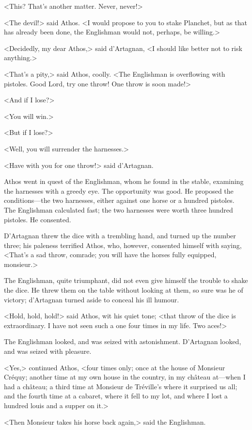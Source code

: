 <This? That's another matter. Never, never!> 

<The devil!> said Athos. <I would propose to you to stake Planchet, but as that has already been done, the Englishman would not, perhaps, be willing.> 

<Decidedly, my dear Athos,> said d'Artagnan, <I should like better not to risk anything.> 

<That's a pity,> said Athos, coolly. <The Englishman is overflowing with pistoles. Good Lord, try one throw! One throw is soon made!> 

<And if I lose?> 

<You will win.> 

<But if I lose?> 

<Well, you will surrender the harnesses.> 

<Have with you for one throw!> said d'Artagnan. 

Athos went in quest of the Englishman, whom he found in the stable, examining the harnesses with a greedy eye. The opportunity was good. He proposed the conditions---the two harnesses, either against one horse or a hundred pistoles. The Englishman calculated fast; the two harnesses were worth three hundred pistoles. He consented. 

D'Artagnan threw the dice with a trembling hand, and turned up the number three; his paleness terrified Athos, who, however, consented himself with saying, <That's a sad throw, comrade; you will have the horses fully equipped, monsieur.> 

The Englishman, quite triumphant, did not even give himself the trouble to shake the dice. He threw them on the table without looking at them, so sure was he of victory; d'Artagnan turned aside to conceal his ill humour. 

<Hold, hold, hold!> said Athos, wit his quiet tone; <that throw of the dice is extraordinary. I have not seen such a one four times in my life. Two aces!> 

The Englishman looked, and was seized with astonishment. D'Artagnan looked, and was seized with pleasure. 

<Yes,> continued Athos, <four times only; once at the house of Monsieur Créquy; another time at my own house in the country, in my château at---when I had a château; a third time at Monsieur de Tréville's where it surprised us all; and the fourth time at a cabaret, where it fell to my lot, and where I lost a hundred louis and a supper on it.> 

<Then Monsieur takes his horse back again,> said the Englishman. 

